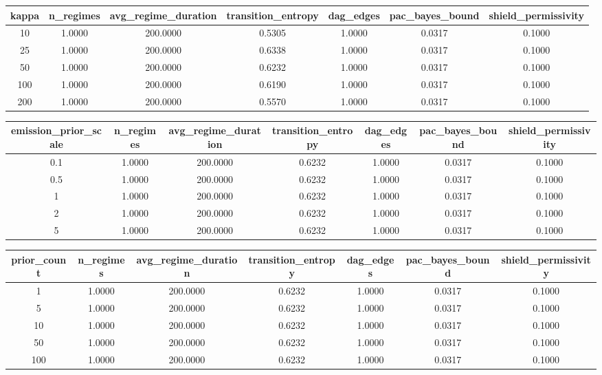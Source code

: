 \begin{tabular}{ccccccc}
\toprule
kappa & n\_regimes & avg\_regime\_duration & transition\_entropy & dag\_edges & pac\_bayes\_bound & shield\_permissivity \\
\midrule
10 & 1.0000 & 200.0000 & 0.5305 & 1.0000 & 0.0317 & 0.1000 \\
25 & 1.0000 & 200.0000 & 0.6338 & 1.0000 & 0.0317 & 0.1000 \\
50 & 1.0000 & 200.0000 & 0.6232 & 1.0000 & 0.0317 & 0.1000 \\
100 & 1.0000 & 200.0000 & 0.6190 & 1.0000 & 0.0317 & 0.1000 \\
200 & 1.0000 & 200.0000 & 0.5570 & 1.0000 & 0.0317 & 0.1000 \\
\bottomrule
\end{tabular}

\begin{tabular}{ccccccc}
\toprule
emission_prior_scale & n\_regimes & avg\_regime\_duration & transition\_entropy & dag\_edges & pac\_bayes\_bound & shield\_permissivity \\
\midrule
0.1 & 1.0000 & 200.0000 & 0.6232 & 1.0000 & 0.0317 & 0.1000 \\
0.5 & 1.0000 & 200.0000 & 0.6232 & 1.0000 & 0.0317 & 0.1000 \\
1 & 1.0000 & 200.0000 & 0.6232 & 1.0000 & 0.0317 & 0.1000 \\
2 & 1.0000 & 200.0000 & 0.6232 & 1.0000 & 0.0317 & 0.1000 \\
5 & 1.0000 & 200.0000 & 0.6232 & 1.0000 & 0.0317 & 0.1000 \\
\bottomrule
\end{tabular}

\begin{tabular}{ccccccc}
\toprule
prior_count & n\_regimes & avg\_regime\_duration & transition\_entropy & dag\_edges & pac\_bayes\_bound & shield\_permissivity \\
\midrule
1 & 1.0000 & 200.0000 & 0.6232 & 1.0000 & 0.0317 & 0.1000 \\
5 & 1.0000 & 200.0000 & 0.6232 & 1.0000 & 0.0317 & 0.1000 \\
10 & 1.0000 & 200.0000 & 0.6232 & 1.0000 & 0.0317 & 0.1000 \\
50 & 1.0000 & 200.0000 & 0.6232 & 1.0000 & 0.0317 & 0.1000 \\
100 & 1.0000 & 200.0000 & 0.6232 & 1.0000 & 0.0317 & 0.1000 \\
\bottomrule
\end{tabular}

